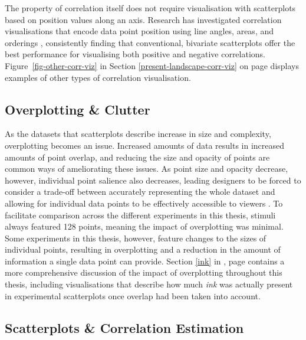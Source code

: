\documentclass[../main.tex]{subfiles}
\begin{document}
The property of correlation itself does not require visualisation with
scatterplots based on position values along an axis. Research has
investigated correlation visualisations that encode data point position
using line angles, areas, and orderings \cite{harrison_2014},
consistently finding that conventional, bivariate scatterplots offer the
best performance for visualising both positive and negative
correlations. Figure~\ref{fig-other-corr-viz} in Section
\ref{present-landscape-corr-viz} on page
\pageref{present-landscape-corr-viz} displays examples of other types of
correlation visualisation.

\subsection{Overplotting \& Clutter}\label{overplotting-clutter}

As the datasets that scatterplots describe increase in size and
complexity, overplotting becomes an issue. Increased amounts of data
results in increased amounts of point overlap, and reducing the size and
opacity of points are common ways of ameliorating these issues. As point
size and opacity decrease, however, individual point salience also
decreases, leading designers to be forced to consider a trade-off
between accurately representing the whole dataset and allowing for
individual data points to be effectively accessible to viewers
\cite{bertini_2004, matejka_2015}. To facilitate comparison across the
different experiments in this thesis, stimuli always featured 128
points, meaning the impact of overplotting was minimal. Some experiments
in this thesis, however, feature changes to the sizes of individual
points, resulting in overplotting and a reduction in the amount of
information a single data point can provide. Section \ref{ink} in
, page \pageref{ink} contains a more
comprehensive discussion of the impact of overplotting throughout this
thesis, including visualisations that describe how much \emph{ink} was
actually present in experimental scatterplots once overlap had been
taken into account.

\subsection{Scatterplots \& Correlation
Estimation}\label{scatterplots-correlation-estimation}
\end{document}
